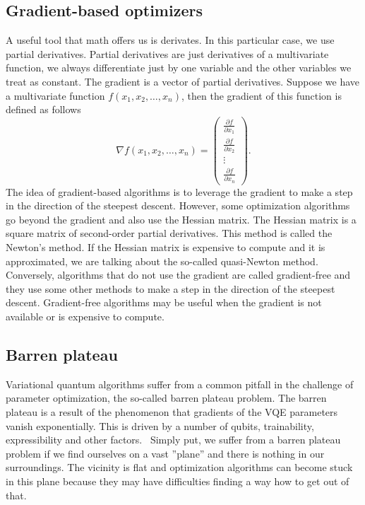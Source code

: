 \subsection{Gradient-based optimizers}
A useful tool that math offers us is derivates. In this particular case, we use partial derivatives. Partial derivatives are just derivatives of a multivariate function, we always differentiate just by one variable and the other variables we treat as constant. The gradient is a vector of partial derivatives. Suppose we have a multivariate function $f(x_1, x_2, \ldots, x_n)$, then the gradient of this function is defined as follows
$$\nabla f(x_1, x_2, \ldots, x_n) =  \begin{pmatrix} \frac{\partial f}{\partial x_1} \\ \frac{\partial f}{\partial x_2} \\ \vdots \\ \frac{\partial f}{\partial x_n}\end{pmatrix} \text{.}$$
The idea of gradient-based algorithms is to leverage the gradient to make a step in the direction of the steepest descent. However, some optimization algorithms go beyond the gradient and also use the Hessian matrix. The Hessian matrix is a square matrix of second-order partial derivatives. This method is called the Newton's method. If the Hessian matrix is expensive to compute and it is approximated, we are talking about the so-called quasi-Newton method. Conversely, algorithms that do not use the gradient are called gradient-free and they use some other methods to make a step in the direction of the steepest descent. Gradient-free algorithms may be useful when the gradient is not available or is expensive to compute.


\subsection{Barren plateau}
Variational quantum algorithms suffer from a common pitfall in the challenge of parameter optimization, the so-called barren plateau problem. The barren plateau is a result of the phenomenon that gradients of the VQE parameters vanish exponentially. This is driven by a number of qubits, trainability, expressibility and other factors.~\cite{fedorov2021vqe} Simply put, we suffer from a barren plateau problem if we find ourselves on a vast ''plane'' and there is nothing in our surroundings. The vicinity is flat and optimization algorithms can become stuck in this plane because they may have difficulties finding a way how to get out of that. 
